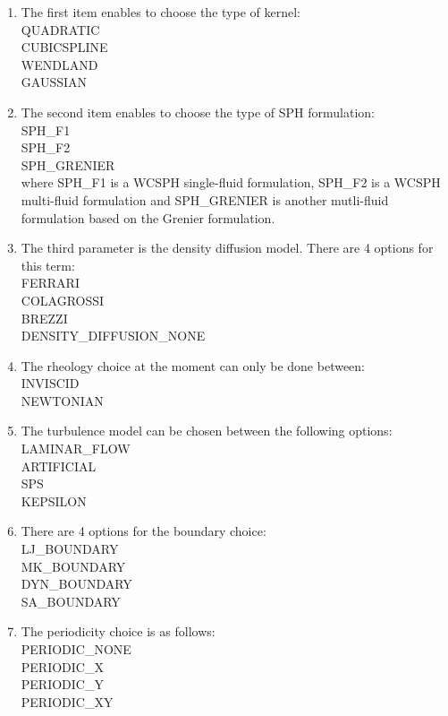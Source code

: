 \documentclass{../GPUSPHtemplate}
\begin{document}
\begin{enumerate}
\item The first item enables to choose the type of kernel:\\
QUADRATIC\\
CUBICSPLINE\\
WENDLAND\\
GAUSSIAN\\
\item The second item enables to choose the type of SPH formulation:\\
SPH\_F1\\
SPH\_F2\\
SPH\_GRENIER\\
where SPH\_F1 is a WCSPH single-fluid formulation, SPH\_F2 is a WCSPH multi-fluid formulation and
SPH\_GRENIER is another mutli-fluid formulation based on the Grenier formulation.
\item The third parameter is the density diffusion model. There are 4 options for this term: \\
FERRARI\\
COLAGROSSI\\
BREZZI\\
DENSITY_DIFFUSION_NONE\\
\item The rheology choice at the moment can only be done between:\\
  INVISCID\\
  NEWTONIAN\\
\item The turbulence model can be chosen between the following options:\\
  LAMINAR_FLOW\\
  ARTIFICIAL\\
  SPS\\
  KEPSILON\\
\item There are 4 options for the boundary choice:\\
LJ\_BOUNDARY\\
MK\_BOUNDARY\\
DYN\_BOUNDARY\\
SA\_BOUNDARY\\
\item The periodicity choice is as follows:\\
  PERIODIC\_NONE \\
  PERIODIC\_X \\
  PERIODIC\_Y \\
  PERIODIC\_XY \\

\end{enumerate}
\end{document}
